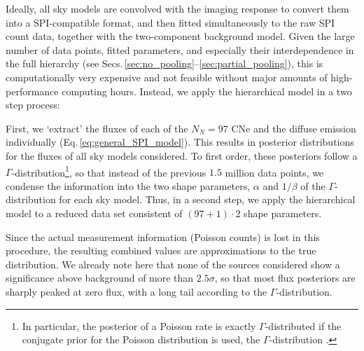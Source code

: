 \documentclass{aa}
\begin{document}
Ideally, all sky models are convolved with the imaging response to convert them into a SPI-compatible format, and then fitted simultaneously to the raw SPI count data, together with the two-component background model.
%
Given the large number of data points, fitted parameters, and especially their interdependence in the full hierarchy (see Secs.\,\ref{sec:no_pooling}--\ref{sec:partial_pooling}), this is computationally very expensive and not feasible without major amounts of high-performance computing hours.
%
Instead, we apply the hierarchical model in a two step process:

First, we `extract' the fluxes of each of the $N_N = 97$ CNe and the diffuse emission individually (Eq.\,\ref{eq:general_SPI_model}).
%
This results in posterior distributions for the fluxes of all sky models considered.
%
To first order, these posteriors follow a $\Gamma$-distribution\footnote{In particular, the posterior of a Poisson rate is exactly $\Gamma$-distributed if the conjugate prior for the Poisson distribution is used, the $\Gamma$-distribution \citep{Gelman2013_BDA3}.}, so that instead of the previous $1.5$ million data points, we condense the information into the two shape parameters, $\alpha$ and $1/\beta$ of the $\Gamma$-distribution for each sky model.
%
Thus, in a second step, we apply the hierarchical model to a reduced data set consistent of $(97+1) \cdot 2$ shape parameters.

Since the actual measurement information (Poisson counts) is lost in this procedure, the resulting combined values are approximations to the true distribution.
%
We already note here that none of the sources considered show a significance above background of more than $2.5\sigma$, so that most flux posteriors are sharply peaked at zero flux, with a long tail according to the $\Gamma$-distribution.
%
\end{document}
